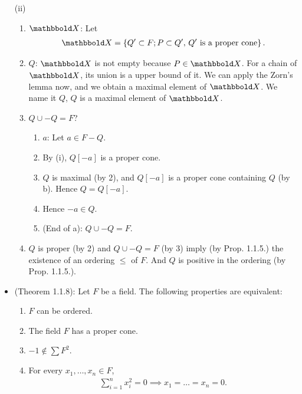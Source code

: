 \documentclass[9pt]{ltjsarticle}
\newcommand{\bbold}{\mathbbold}
\begin{document}
\begin{itemize}
  \pf (ii)
  \begin{enumerate}
    \item $\bbold X$:
    Let
    \begin{align}
      \bbold X = \set{Q' \subset F; P\subset Q',\, \text{$Q'$ is a proper cone}}.
    \end{align}
    \item $Q$:
    $\bbold X$ is not empty because $P \in \bbold X$.
    For a chain of $\bbold X$, its union is a upper bound of it.
    We can apply the Zorn's lemma now, and we obtain a maximal element of $\bbold X$.
    We name it $Q$, $Q$ is a maximal element of $\bbold X$.
    \item
    $Q\cup -Q = F$?
    \begin{enumerate}
      \item $a$: Let $a\in F-Q$.
      \item By (i), $Q[-a]$ is a proper cone.
      \item $Q$ is maximal (by 2), and $Q[-a]$ is a proper cone containing $Q$ (by b).
      Hence $Q=Q[-a]$.
      \item
      Hence $-a \in Q$.
      \item
      (End of a):
      $Q\cup -Q = F$.
    \end{enumerate}
    \item
    $Q$ is proper (by 2) and $Q\cup -Q = F$ (by 3) imply
    (by Prop. 1.1.5.)
    the existence of an ordering $\le$ of $F$.
    And $Q$ is positive in the ordering (by Prop. 1.1.5.).


  \end{enumerate}
  \item
  (Theorem 1.1.8):
  Let $F$ be a field.
  The following properties are equivalent:
  \begin{enumerate}[label=(\roman*)]
    \item $F$ can be ordered.
    \item The field $F$ has a proper cone.
    \item $-1\notin \sum F^2$.
    \item For every $x_1,\dots,x_n \in F$,
    \begin{align}
      \sum_{i=1}^n x_i^2 = 0 \implies
      x_1 = \dots = x_n = 0.
    \end{align}

  \end{enumerate}


\end{itemize}
\end{document}
